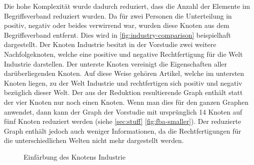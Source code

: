 Die hohe Komplexität wurde dadurch reduziert, dass die Anzahl der Elemente im Begriffsverband reduziert wurden.
Da für zwei Personen die Unterteilung in positiv, negativ oder beides verwirrend war, wurden diese Knoten aus dem Begriffsverband entfernt.
Dies wird in \autoref{fig:industry-comparison} beispielhaft dargestellt.
Der Knoten Industrie besitzt in der Vorstudie zwei weitere Nachfolgeknoten, welche eine positive und negative Rechtfertigung für die Welt Industrie darstellen.
Der unterste Knoten vereinigt die Eigenschaften aller darüberliegenden Knoten.
Auf diese Weise gehören Artikel, welche im untersten Knoten liegen, zu der Welt Industrie und rechtfertigen sich positiv und negativ bezüglich dieser Welt.
Der aus der Reduktion resultierende Graph enthält statt der vier Knoten nur noch einen Knoten.
Wenn man dies für den ganzen Graphen anwendet, dann kann der Graph der Vorstudie mit ursprünglich 14 Knoten auf fünf Knoten reduziert werden (siehe \autoref{sec:stuff} \autoref{fig:fba-smaller}).
Der reduzierte Graph enthält jedoch auch weniger Informationen, da die Rechtfertigungen für die unterschiedlichen Welten nicht mehr dargestellt werden.\\

\begin{figure}[!ht]
    \centering
    \caption{Einfärbung des Knotens Industrie}
    \label{fig:industry-colored}
\end{figure}

